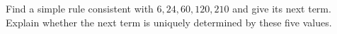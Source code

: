 Find a simple rule consistent with $6,24,60,120,210$ and give its next term. Explain whether the next term is uniquely determined by these five values.
